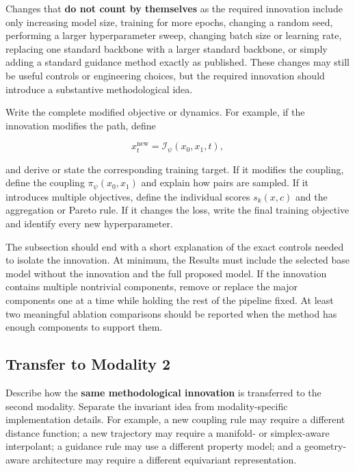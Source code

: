\documentclass{article}
\begin{document}
Changes that \textbf{do not count by themselves} as the required innovation include only increasing model size, training for more epochs, changing a random seed, performing a larger hyperparameter sweep, changing batch size or learning rate, replacing one standard backbone with a larger standard backbone, or simply adding a standard guidance method exactly as published. These changes may still be useful controls or engineering choices, but the required innovation should introduce a substantive methodological idea.

Write the complete modified objective or dynamics. For example, if the innovation modifies the path, define

\begin{equation}
    x_t^{\mathrm{new}}
    =
    \mathcal{I}_{\psi}(x_0,x_1,t),
\end{equation}

and derive or state the corresponding training target. If it modifies the coupling, define the coupling $\pi_{\psi}(x_0,x_1)$ and explain how pairs are sampled. If it introduces multiple objectives, define the individual scores $s_k(x,c)$ and the aggregation or Pareto rule. If it changes the loss, write the final training objective and identify every new hyperparameter.

The subsection should end with a short explanation of the exact controls needed to isolate the innovation. At minimum, the Results must include the selected base model without the innovation and the full proposed model. If the innovation contains multiple nontrivial components, remove or replace the major components one at a time while holding the rest of the pipeline fixed. At least two meaningful ablation comparisons should be reported when the method has enough components to support them.

\subsection{Transfer to Modality 2}

Describe how the \textbf{same methodological innovation} is transferred to the second modality. Separate the invariant idea from modality-specific implementation details. For example, a new coupling rule may require a different distance function; a new trajectory may require a manifold- or simplex-aware interpolant; a guidance rule may use a different property model; and a geometry-aware architecture may require a different equivariant representation.
\end{document}
